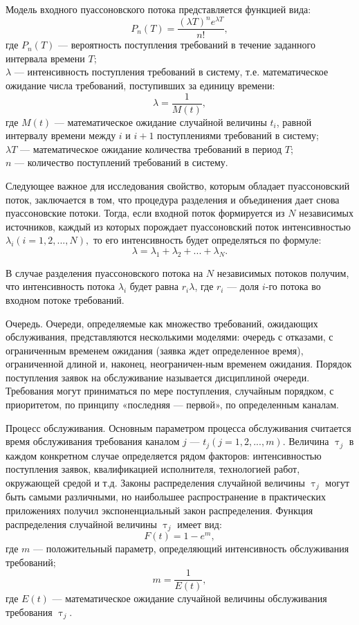 Модель входного пуассоновского потока представляется функцией вида:
\[P_n(T) = \dfrac{(\lambda T)^ne^{\lambda T}}{n!},\]
где $ P_n(T)  $ --- вероятность поступления требований в течение заданного интервала времени $T$; \\
$\lambda$ --- интенсивность поступления требований в систему, т.е. математическое ожидание числа требований, поступивших за единицу времени:
\[\lambda =  \dfrac{1}{M(t)},\]
где $M(t)$ --- математическое ожидание случайной величины $t_i$, равной интервалу времени между $i$ и $i + 1$ поступлениями требований в систему; \\
$\lambda T$ --- математическое ожидание количества требований в период $T$; \\
$n$ --- количество поступлений требований в систему.

Следующее важное для исследования свойство, которым обладает пуассоновский поток, заключается в том, что процедура разделения и объединения дает снова пуассоновские потоки. Тогда, если входной поток формируется из $N$ независимых источников, каждый из которых порождает пуассоновский поток интенсивностью $\lambda_i (i=1,2,..., N),$ то его интенсивность будет определяться по формуле:
\[\lambda = \lambda_1 + \lambda_2 + ... + \lambda_N.\]

В случае разделения пуассоновского потока на $ N $ независимых потоков получим, что интенсивность потока $\lambda_i$ будет равна $r_i \lambda$, где $r_i$ --- доля $i$-го потока во входном потоке требований.

Очередь. Очереди, определяемые как множество требований, ожидающих обслуживания, представляются несколькими моделями: очередь с отказами, с ограниченным временем ожидания (заявка ждет определенное время), ограниченной длиной и, наконец, неограничен-ным временем ожидания. Порядок поступления заявок на обслуживание называется дисциплиной очереди. Требования могут приниматься по мере поступления, случайным порядком, с приоритетом, по принципу «последняя --- первой», по определенным каналам.

Процесс обслуживания. Основным параметром процесса обслуживания считается время обслуживания требования каналом $j$ --- $t_j(j =1,2,...,m)$. Величина $\uptau_j$ в каждом конкретном случае определяется рядом факторов: интенсивностью поступления заявок, квалификацией исполнителя, технологией работ, окружающей средой и т.д. Законы распределения случайной величины $\uptau_j$ могут быть самыми различными, но наибольшее распространение в практических приложениях получил экспоненциальный закон распределения. Функция распределения случайной величины $\uptau_j$ имеет вид:
\[F(t)=1-e^m,\]
где $m$ --- положительный параметр, определяющий интенсивность обслуживания требований;
\[m=\dfrac{1}{E(t)},\]
где $E(t)$ --- математическое ожидание случайной величины обслуживания требования $\uptau_j$.

